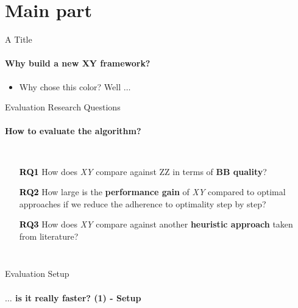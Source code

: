 \documentclass[
	english,%
	aspectratio=169,%
	color={accentcolor=1b},
	logo=true,%
	colorframetitle=true,%
	authorontitle=true,
	usepdftitle=false,
	]{tudabeamer}
\begin{document}
%
%

\section{Main part}

\begin{frame}{A Title}
	\framesubtitle{Why build a new XY framework?}
	\label{framework}
	
	\begin{itemize}
		\item \textcolor{TUDa-0c}{Why chose this color? Well $\ldots$}
	\end{itemize}
\end{frame}

\begin{frame}{Evaluation Research Questions}
	\framesubtitle{How to evaluate the algorithm?}
	\label{eval-research-questions}
	
	\vspace{3.5em}

	\begin{columns}[onlytextwidth,c]
	
		\begin{itemize}
			\itemsep1.5em
			\item[\textcolor{black}{\textbf{RQ1}}] How does \textit{XY} compare against ZZ in terms of \textbf{BB quality}?
	
			\item[\textcolor{black}{\textbf{RQ2}}] How large is the \textbf{performance gain} of \textit{XY} compared to optimal approaches if we reduce the adherence to optimality step by step?
			
			\item[\textcolor{black}{\textbf{RQ3}}] How does \textit{XY} compare against another \textbf{heuristic approach} taken from literature?
		\end{itemize}

	\end{columns}
	
\end{frame}

\begin{frame}{Evaluation Setup}
	\framesubtitle{$\ldots$ is it really faster? (1) - Setup}
	\label{results-setup}
	
\end{frame}
\end{document}
